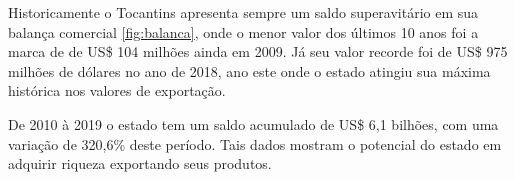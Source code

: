 \par Historicamente o Tocantins apresenta sempre um saldo superavitário em sua balança comercial \ref{fig:balanca}, onde o menor valor dos últimos 10 anos foi a marca de de US\$ 104 milhões ainda em 2009. Já seu valor recorde foi de US\$ 975 milhões de dólares no ano de 2018, ano este onde o estado atingiu sua máxima histórica nos valores de exportação.

\par De 2010 à 2019 o estado tem um saldo acumulado de US\$ 6,1 bilhões, com uma variação de 320,6\% deste período. Tais dados mostram o potencial do estado em adquirir riqueza exportando seus produtos.


